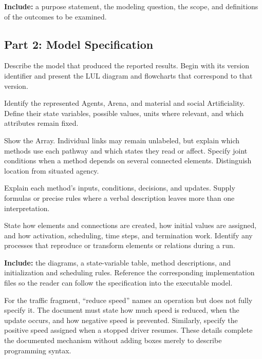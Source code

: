 \documentclass[11pt,a4paper]{article}
\begin{document}
\textbf{Include:} a purpose statement, the modeling question, the scope, and definitions of the outcomes to be examined.

\subsection{Part 2: Model Specification}

Describe the model that produced the reported results. Begin with its version identifier and present the LUL diagram and flowcharts that correspond to that version.

\begin{description}[style=nextline,leftmargin=0pt,itemsep=5pt]
\item[Elements and states] Identify the represented Agents, Arena, and material and social Artificiality. Define their state variables, possible values, units where relevant, and which attributes remain fixed.
\item[Connections] Show the Array. Individual links may remain unlabeled, but explain which methods use each pathway and which states they read or affect. Specify joint conditions when a method depends on several connected elements. Distinguish location from situated agency.
\item[Methods and processes] Explain each method's inputs, conditions, decisions, and updates. Supply formulas or precise rules where a verbal description leaves more than one interpretation.
\item[Initialization and time] State how elements and connections are created, how initial values are assigned, and how activation, scheduling, time steps, and termination work. Identify any processes that reproduce or transform elements or relations during a run.
\end{description}

\textbf{Include:} the diagrams, a state-variable table, method descriptions, and initialization and scheduling rules. Reference the corresponding implementation files so the reader can follow the specification into the executable model.

For the traffic fragment, ``reduce speed'' names an operation but does not fully specify it. The document must state how much speed is reduced, when the update occurs, and how negative speed is prevented. Similarly, specify the positive speed assigned when a stopped driver resumes. These details complete the documented mechanism without adding boxes merely to describe programming syntax.
\end{document}
